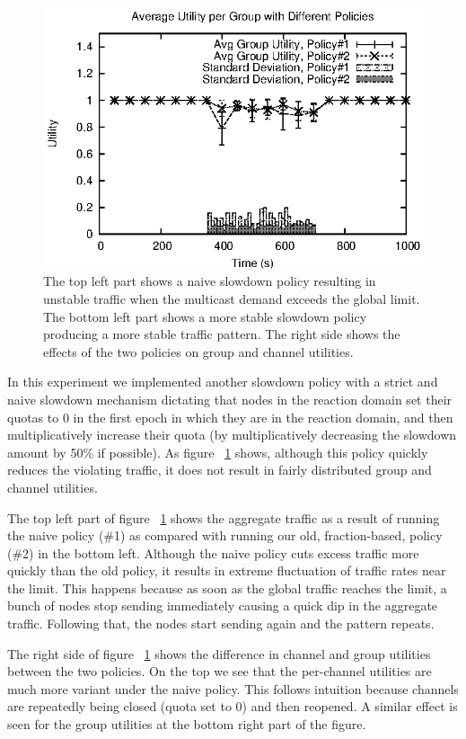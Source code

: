 \begin{figure}[t]
 \includegraphics{figures/evaluation/policy/groups-utility.eps}
 \caption{The top left part shows a naive slowdown policy resulting in unstable traffic when the multicast demand exceeds the global limit. The bottom left part shows a more stable slowdown policy producing a more stable traffic pattern. The right side shows the effects of the two policies on group and channel utilities.}
 \label{fig:policy}
\end{figure}

In this experiment we implemented another slowdown policy with a strict and naive slowdown mechanism dictating that nodes in the reaction domain set their quotas to 0 in the first epoch in which they are in the reaction domain, and then multiplicatively increase their quota (by multiplicatively decreasing the slowdown amount by 50\% if possible). As figure ~\ref{fig:policy} shows, although this policy quickly reduces the violating traffic, it does not result in fairly distributed group and channel utilities.

The top left part of figure ~\ref{fig:policy} shows the aggregate traffic as a result of running the naive policy (\#1) as compared with running our old, fraction-based, policy (\#2) in the bottom left. Although the naive policy cuts excess traffic more quickly than the old policy, it results in extreme fluctuation of traffic rates near the limit. This happens because as soon as the global traffic reaches the limit, a bunch of nodes stop sending immediately causing a quick dip in the aggregate traffic. Following that, the nodes start sending again and the pattern repeats.

The right side of figure ~\ref{fig:policy} shows the difference in channel and group utilities between the two policies. On the top we see that the per-channel utilities are much more variant under the naive policy. This follows intuition because channels are repeatedly being closed (quota set to 0) and then reopened. A similar effect is seen for the group utilities at the bottom right part of the figure.
